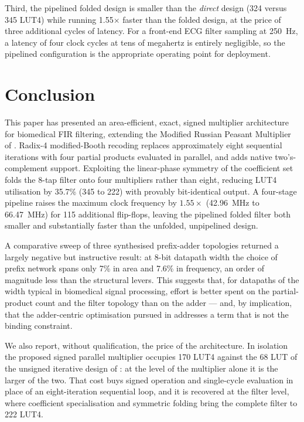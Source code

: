 \documentclass[conference]{IEEEtran}
\begin{document}
Third, the pipelined folded design is smaller than the \emph{direct}
design (324 versus 345 LUT4) while running 1.55$\times$ faster than the
folded design, at the price of three additional cycles of latency. For a
front-end ECG filter sampling at 250~Hz, a latency of four clock cycles
at tens of megahertz is entirely negligible, so the pipelined
configuration is the appropriate operating point for deployment.

\section{Conclusion}
\label{sec:concl}

This paper has presented an area-efficient, exact, signed multiplier
architecture for biomedical FIR filtering, extending the Modified
Russian Peasant Multiplier of \cite{base}. Radix-4 modified-Booth
recoding replaces approximately eight sequential iterations with four
partial products evaluated in parallel, and adds native
two's-complement support. Exploiting the linear-phase symmetry of the
coefficient set folds the 8-tap filter onto four multipliers rather than
eight, reducing LUT4 utilisation by 35.7\% (345 to 222) with provably
bit-identical output. A four-stage pipeline raises the maximum clock
frequency by $1.55\times$ (42.96~MHz to 66.47~MHz) for 115 additional
flip-flops, leaving the pipelined folded filter both smaller and
substantially faster than the unfolded, unpipelined design.

A comparative sweep of three synthesised prefix-adder topologies
returned a largely negative but instructive result: at 8-bit datapath
width the choice of prefix network spans only 7\% in area and 7.6\% in
frequency, an order of magnitude less than the structural levers. This
suggests that, for datapaths of the width typical in biomedical signal
processing, effort is better spent on the partial-product count and the
filter topology than on the adder --- and, by implication, that the
adder-centric optimisation pursued in \cite{base} addresses a term that
is not the binding constraint.

We also report, without qualification, the price of the architecture. In
isolation the proposed signed parallel multiplier occupies 170 LUT4
against the 68 LUT of the unsigned iterative design of \cite{base}: at
the level of the multiplier alone it is the larger of the two. That cost
buys signed operation and single-cycle evaluation in place of an
eight-iteration sequential loop, and it is recovered at the filter level,
where coefficient specialisation and symmetric folding bring the complete
filter to 222 LUT4.
\end{document}
